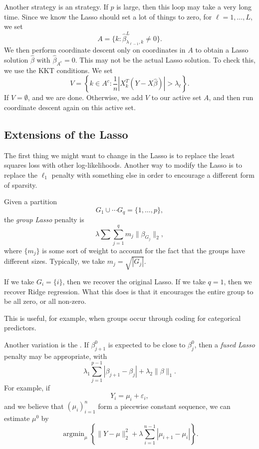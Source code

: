 \documentclass[a4paper]{article}
\DeclareMathOperator*\argmin{argmin}
\begin{document}
Another strategy is an  strategy. If $p$ is large, then this loop may take a very long time. Since we know the Lasso should set a lot of things to zero, for $\ell = 1, \ldots, L$, we set
\[
  A = \{ k : \hat{\beta}^L_{\lambda_{\ell - 1}, k} \not= 0 \}.
\]
We then perform coordinate descent only on coordinates in $A$ to obtain a Lasso solution $\hat{\beta}$ with $\hat{\beta}_{A^c} = 0$. This may not be the actual Lasso solution. To check this, we use the KKT conditions. We set
\[
  V = \left\{k \in A^c: \frac{1}{n} |X_k^T(Y - X \hat{\beta})| > \lambda_\ell \right\}.
\]
If $V = \emptyset$, and we are done. Otherwise, we add $V$ to our active set $A$, and then run coordinate descent again on this active set.

\subsection{Extensions of the Lasso}
The first thing we might want to change in the Lasso is to replace the least squares loss with other log-likelihoods. Another way to modify the Lasso is to replace the $\ell_1$ penalty with something else in order to encourage a different form of sparsity.

\begin{eg}
  Given a partition
  \[
    G_1 \cup \cdots G_q = \{1, \ldots, p\},
  \]
  the \emph{group Lasso} penalty is
  \[
    \lambda \sum \sum_{j = 1}^q m_j \|\beta_{G_j}\|_2,
  \]
  where $\{m_j\}$ is some sort of weight to account for the fact that the groups have different sizes. Typically, we take $m_j = \sqrt{|G_j|}$.

  If we take $G_i = \{i\}$, then we recover the original Lasso. If we take $q = 1$, then we recover Ridge regression. What this does is that it encourages the entire group to be all zero, or all non-zero.

  This is useful, for example, when groups occur through coding for categorical predictors.
\end{eg}

\begin{eg}
  Another variation is the . If $\beta^0_{j + 1}$ is expected to be close to $\beta_j^0$,  then a \emph{fused Lasso} penalty may be appropriate, with
  \[
    \lambda_1 \sum_{j = 1}^{p - 1} |\beta_{j + 1} - \beta_j| + \lambda_2 \|\beta\|_1.
  \]
  For example, if
  \[
    Y_i = \mu_i + \varepsilon_i,
  \]
  and we believe that $(\mu_i)_{i = 1}^n$ form a piecewise constant sequence, we can estimate $\mu^0$ by
  \[
    \argmin_\mu \left\{\|Y - \mu\|_2^2 + \lambda \sum_{i = 1}^{n - 1} |\mu_{i + 1} - \mu_i|\right\}.
  \]
\end{eg}
\end{document}
